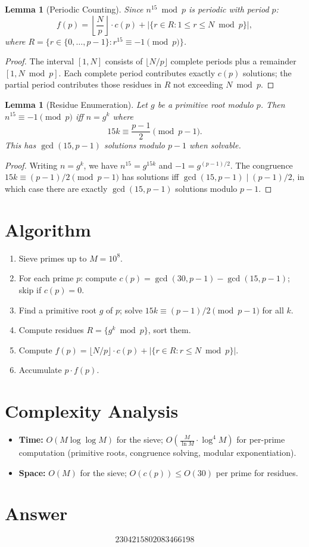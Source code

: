 \documentclass[12pt]{article}
\newtheorem{lemma}[theorem]{Lemma}
\begin{document}
\begin{lemma}[Periodic Counting]
Since $n^{15} \bmod p$ is periodic with period $p$:
\[
f(p) = \left\lfloor \frac{N}{p} \right\rfloor \cdot c(p) + |\{r \in R : 1 \le r \le N \bmod p\}|,
\]
where $R = \{r \in \{0,\ldots,p-1\} : r^{15} \equiv -1 \pmod{p}\}$.
\end{lemma}

\begin{proof}
The interval $[1,N]$ consists of $\lfloor N/p \rfloor$ complete periods plus a remainder $[1, N \bmod p]$. Each complete period contributes exactly $c(p)$ solutions; the partial period contributes those residues in $R$ not exceeding $N \bmod p$.
\end{proof}

\begin{lemma}[Residue Enumeration]
Let $g$ be a primitive root modulo $p$. Then $n^{15} \equiv -1 \pmod{p}$ iff $n = g^k$ where
\[
15k \equiv \frac{p-1}{2} \pmod{p-1}.
\]
This has $\gcd(15, p-1)$ solutions modulo $p-1$ when solvable.
\end{lemma}

\begin{proof}
Writing $n = g^k$, we have $n^{15} = g^{15k}$ and $-1 = g^{(p-1)/2}$. The congruence $15k \equiv (p-1)/2 \pmod{p-1}$ has solutions iff $\gcd(15,p-1) \mid (p-1)/2$, in which case there are exactly $\gcd(15,p-1)$ solutions modulo $p-1$.
\end{proof}

\section{Algorithm}
\begin{enumerate}
    \item Sieve primes up to $M = 10^8$.
    \item For each prime $p$: compute $c(p) = \gcd(30,p-1) - \gcd(15,p-1)$; skip if $c(p)=0$.
    \item Find a primitive root $g$ of $p$; solve $15k \equiv (p-1)/2 \pmod{p-1}$ for all $k$.
    \item Compute residues $R = \{g^k \bmod p\}$, sort them.
    \item Compute $f(p) = \lfloor N/p \rfloor \cdot c(p) + |\{r \in R : r \le N \bmod p\}|$.
    \item Accumulate $p \cdot f(p)$.
\end{enumerate}

\section{Complexity Analysis}
\begin{itemize}
    \item \textbf{Time:} $O(M \log\log M)$ for the sieve; $O\!\left(\frac{M}{\ln M} \cdot \log^4 M\right)$ for per-prime computation (primitive roots, congruence solving, modular exponentiation).
    \item \textbf{Space:} $O(M)$ for the sieve; $O(c(p)) \le O(30)$ per prime for residues.
\end{itemize}

\section{Answer}

\[
\boxed{2304215802083466198}
\]
\end{document}
